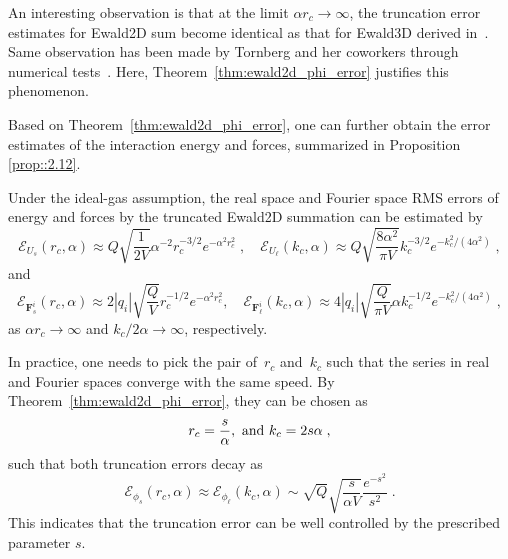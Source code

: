 An interesting observation is that at the limit $\alpha r_c\rightarrow \infty$, the truncation error estimates for Ewald2D sum become identical as that for Ewald3D derived in~\cite{kolafa1992cutoff}.
Same observation has been made by Tornberg and her coworkers through numerical tests~\cite{lindbo2012fast,shamshirgar2021fast}. 
Here, Theorem~\ref{thm:ewald2d_phi_error} justifies this phenomenon.

Based on Theorem~\ref{thm:ewald2d_phi_error}, one can further obtain the error estimates of the interaction energy and forces, summarized in Proposition \ref{prop::2.12}.

\begin{prop}\label{prop::2.12}
	Under the ideal-gas assumption, the real space and Fourier space RMS errors of energy and forces by the truncated Ewald2D summation can be estimated by
	\begin{equation}\label{thm:ewald2d_error}
		\mathscr{E}_{U_s} (r_c, \alpha) \approx Q \sqrt{\frac{1}{2 V}} \alpha^{-2} r_c^{-3/2} e^{-\alpha^2r_c^2}\;,\quad
		\mathscr{E}_{U_{\ell}} (k_c, \alpha) \approx Q \sqrt{\frac{8 \alpha^2}{\pi V}} k_c^{-3/2} e^{- k_c^2/(4 \alpha^2)}\;,
	\end{equation}
	and
	\begin{equation}
		\mathscr{E}_{\bm{F}_{s}^i} (r_c, \alpha)\approx 2|q_{i}|\sqrt{\frac{Q}{V}}r_c^{-1/2}e^{-\alpha^2 r_c^2},\quad \mathscr{E}_{\bm{F}_{\ell}^i} (k_c, \alpha)\approx 4|q_{i}|\sqrt{\frac{Q}{\pi V}}\alpha k_c^{-1/2}e^{-k_c^2/(4\alpha^2)}\;,
	\end{equation}
	as $\alpha r_c\rightarrow\infty$ and $k_c/2\alpha\rightarrow\infty$, respectively.
\end{prop}

\begin{rmk}
	In practice, one needs to pick the pair of~$r_c$ and~$k_c$
	such that the series in real and Fourier spaces converge with the same speed.
	By Theorem~\ref{thm:ewald2d_phi_error}, they can be chosen as
	\begin{equation}\label{eq::rckc}
		r_c = \frac{s}{\alpha},~\hbox{and}~k_c = 2 s \alpha\;,
	\end{equation}
	such that both truncation errors decay as 
	\begin{equation}\label{eq:truncation_error}
		\mathscr{E}_{\phi_s}(r_c, \alpha)\approx \mathscr{E}_{\phi_\ell}(k_c, \alpha) \sim \sqrt{Q} 
		\sqrt{\frac{s}{\alpha V}} \frac{e^{-s^2}}{s^2}\;.
	\end{equation}
	This indicates that the truncation error can be well controlled by the prescribed parameter $s$. 
\end{rmk}

